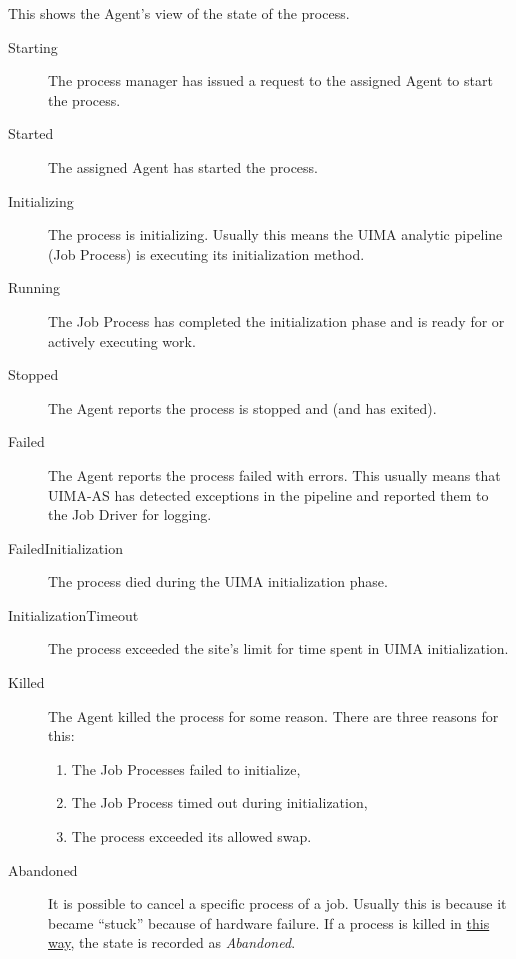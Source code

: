 \begin{description}
            This shows the {\DUCC} Agent's view of the state of the process.
            \begin{description}
               \item[Starting] The {\DUCC} process manager has issued a request to the assigned {\DUCC} Agent to
                 start the process.
               \item[Started] The assigned {\DUCC} Agent has started the process.
               \item[Initializing] The process is initializing.  Usually this means the UIMA analytic
                 pipeline (Job Process) is executing its initialization method.
              \item[Running] The Job Process has completed the initialization phase and is ready for 
                or actively executing work.
              \item[Stopped] The {\DUCC} Agent reports the process is stopped and (and has exited).
              \item[Failed] The {\DUCC} Agent reports the process failed with errors.  This usually
                means that UIMA-AS has detected exceptions in the pipeline and reported them
                to the Job Driver for logging.
              \item[FailedInitialization] The process died during the UIMA initialization phase.
              \item[InitializationTimeout] The process exceeded the site's limit for time spent
                in UIMA initialization.
              \item[Killed] The {\DUCC} Agent killed the process for some reason.  There are
                three reasons for this:
                \begin{enumerate}
                  \item The Job Processes failed to initialize,
                  \item The Job Process timed out during initialization,
                  \item The process exceeded its allowed swap.
                \end{enumerate}
              \item[Abandoned] It is possible to cancel a specific process of a job.  Usually
                this is because it became ``stuck'' because of hardware failure.  If a process
                is killed in \hyperref[sec:cli.ducc-cancel]{this way}, the state is recorded as {\em Abandoned}.
            \end{description}
            

\end{description}
